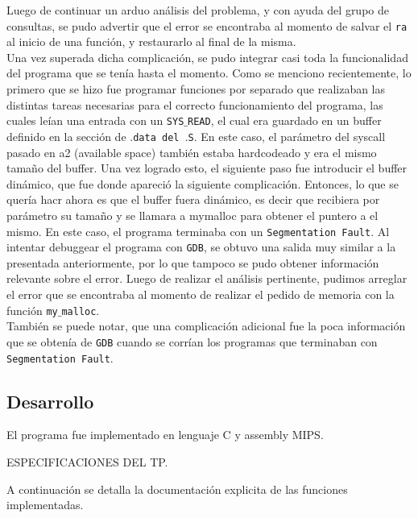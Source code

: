 \documentclass[a4paper, 10pt]{article}
\def\code#1{\texttt{#1}}
\begin{document}
		Luego de continuar un arduo análisis del problema, y con ayuda del grupo de consultas, se pudo advertir que el error se encontraba al momento de salvar el \code{ra} al inicio de una función, y restaurarlo al final de la misma.
		\\
		Una vez superada dicha complicación, se pudo integrar casi toda la funcionalidad del programa que se tenía hasta el momento. Como se menciono recientemente, lo primero que se hizo fue programar funciones por separado que realizaban las distintas tareas necesarias para el correcto funcionamiento del programa, las cuales leían una entrada con un \code{SYS$\_$READ}, el cual era guardado en un buffer definido en la sección de \code{$.$data del $.$S}. En este caso, el parámetro del syscall pasado en a2 (available space) también estaba hardcodeado y era el mismo tamaño del buffer. Una vez logrado esto, el siguiente paso fue introducir el buffer dinámico, que fue donde apareció la siguiente complicación. Entonces, lo que se quería hacr ahora es que el buffer fuera dinámico, es decir que recibiera por parámetro su tamaño y se llamara a mymalloc para obtener el puntero a el mismo. En este caso, el programa terminaba con un \code{Segmentation Fault}. Al intentar debuggear el programa con \code{GDB}, se obtuvo una salida muy similar a la presentada anteriormente, por lo que tampoco se pudo obtener información relevante sobre el error. Luego de realizar el análisis pertinente, pudimos arreglar el error que se encontraba al momento de realizar el pedido de memoria con la función \code{my$\_$malloc}.
		\\
		También se puede notar, que una complicación adicional fue la poca información que se obtenía de \code{GDB} cuando se corrían los programas que terminaban con \code{Segmentation Fault}.



		\subsection{Desarrollo}
			El programa fue implementado en lenguaje C y assembly MIPS.
			
			ESPECIFICACIONES DEL TP.			
			
			A continuación se detalla la documentación explicita de las funciones implementadas.
\end{document}
